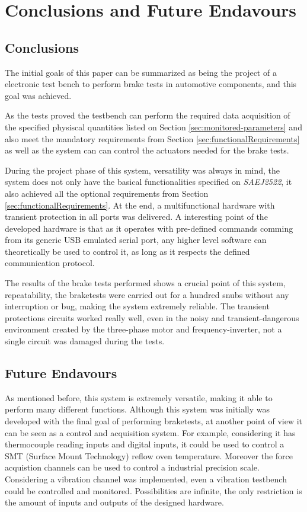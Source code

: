 \chapter{Conclusions and Future Endavours}\label{ch:conclusions-and-future-endavours}
	
	\section{Conclusions}\label{sec:conclusions}

		The initial goals of this paper can be summarized as being the project of a electronic test bench to perform brake tests in automotive components, and this goal was achieved.
		\par
		As the tests proved the testbench can perform the required data acquisition of the specified physiscal quantities listed on Section \ref{sec:monitored-parameters} and also meet the mandatory requirements from Section \ref{sec:functionalRequirements} as well as the system can can control the actuators needed for the brake tests.
		\par
		During the project phase of this system, versatility was always in mind, the system does not only have the basical functionalities specified on \textit{SAEJ2522}, it also achieved all the optional requirements from Section \ref{sec:functionalRequirements}. At the end, a multifunctional hardware with transient protection in all ports was delivered. A interesting point of the developed hardware is that as it operates with pre-defined commands comming from its generic USB emulated serial port, any higher level software can theoretically be used to control it, as long as it respects the defined communication protocol.
		\par
		The results of the brake tests performed shows a crucial point of this system, repeatability, the braketests were carried out for a hundred snubs without any interruption or bug, making the system extremely reliable. The transient protections circuits worked really well, even in the noisy and transient-dangerous environment created by the three-phase motor and frequency-inverter, not a single circuit was damaged during the tests.

	\section{Future Endavours}\label{sec:future-endavours}

		As mentioned before, this system is extremely versatile, making it able to perform many different functions. Although this system was initially was developed with the final goal of performing braketests, at another point of view it can be seen as a control and acquisition system. For example, considering it has thermocouple reading inputs and digital inputs, it could be used to control a SMT (Surface Mount Technology)  reflow oven temperature. Moreover the force acquistion channels can be used to control a industrial precision scale. Considering a vibration channel was implemented, even a vibration testbench could be controlled and monitored. Possibilities are infinite, the only restriction is the amount of inputs and outputs of the designed hardware.